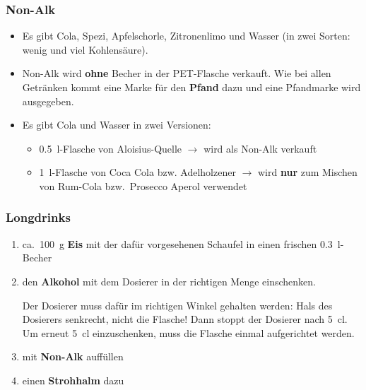 \subsubsection{Non-Alk}
\begin{itemize}
  \item Es gibt Cola, Spezi, Apfelschorle, Zitronenlimo und Wasser (in zwei Sorten: wenig und viel Kohlensäure).
  \item Non-Alk wird \textbf{ohne} Becher in der PET-Flasche verkauft. Wie bei allen Getränken kommt eine Marke für den \textbf{Pfand} dazu und eine Pfandmarke wird ausgegeben.
  \item Es gibt Cola und Wasser in zwei Versionen:
    \begin{itemize}
      \item \SI{0.5}{\litre}-Flasche von Aloisius-Quelle $\rightarrow$ wird als Non-Alk verkauft
      \item \SI{1}{\litre}-Flasche von Coca Cola bzw. Adelholzener $\rightarrow$ wird \textbf{nur} zum Mischen von Rum-Cola bzw.\ Prosecco Aperol verwendet
    \end{itemize}
\end{itemize}
\subsubsection{Longdrinks}
\begin{enumerate}
  \item ca.\ \SI{100}{\gram} \textbf{Eis} mit der dafür vorgesehenen Schaufel in einen frischen \SI{0.3}{\litre}-Becher
  \item den \textbf{Alkohol} mit dem Dosierer in der richtigen Menge einschenken.
    
    Der Dosierer muss dafür im richtigen Winkel gehalten werden: Hals des Dosierers senkrecht, nicht die Flasche! Dann stoppt der Dosierer nach \SI{5}{\centi\litre}. Um erneut \SI{5}{\centi\litre} einzuschenken, muss die Flasche einmal aufgerichtet werden.
  \item mit \textbf{Non-Alk} auffüllen
  \item einen \textbf{Strohhalm} dazu
\end{enumerate}

